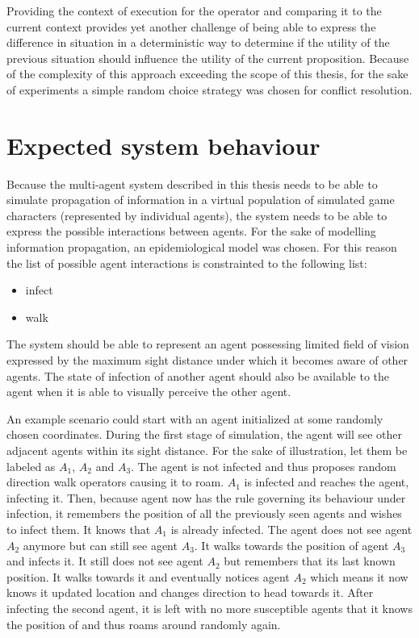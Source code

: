 Providing the context of execution for the operator and comparing it to the current context provides yet another challenge of being able to express the difference in situation in a deterministic way to determine if the utility of the previous situation should influence the utility of the current proposition.
Because of the complexity of this approach exceeding the scope of this thesis, for the sake of experiments a simple random choice strategy was chosen for conflict resolution.

\section{Expected system behaviour}

Because the multi-agent system described in this thesis needs to be able to simulate propagation of information in a virtual population of simulated game characters (represented by individual agents), the system needs to be able to express the possible interactions between agents.
For the sake of modelling information propagation, an epidemiological model was chosen.
For this reason the list of possible agent interactions is constrainted to the following list:

\begin{itemize}
    \item infect
    \item walk
\end{itemize}

The system should be able to represent an agent possessing limited field of vision expressed by the maximum sight distance under which it becomes aware of other agents.
The state of infection of another agent should also be available to the agent when it is able to visually perceive the other agent.

An example scenario could start with an agent initialized at some randomly chosen coordinates.
During the first stage of simulation, the agent will see other adjacent agents within its sight distance.
For the sake of illustration, let them be labeled as $A_1$, $A_2$ and $A_3$.
The agent is not infected and thus proposes random direction walk operators causing it to roam.
$A_1$ is infected and reaches the agent, infecting it.
Then, because agent now has the rule governing its behaviour under infection, it remembers the position of all the previously seen agents and wishes to infect them.
It knows that $A_1$ is already infected.
The agent does not see agent $A_2$ anymore but can still see agent $A_3$.
It walks towards the position of agent $A_3$ and infects it.
It still does not see agent $A_2$ but remembers that its last known position.
It walks towards it and eventually notices agent $A_2$ which means it now knows it updated location and changes direction to head towards it.
After infecting the second agent, it is left with no more susceptible agents that it knows the position of and thus roams around randomly again.

